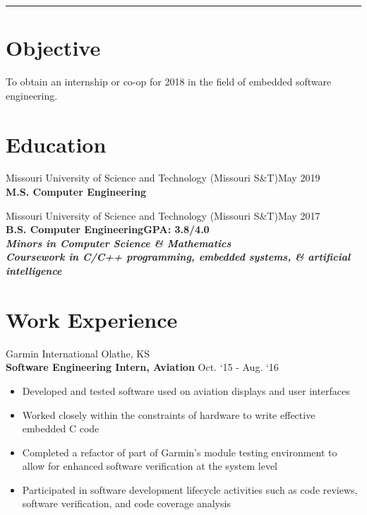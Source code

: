 \documentclass[resmargin]{res}
\begin{document}

\address{503 N. Oak St.\\Rolla, MO 65401}
\address{816-785-4105\\sm67c@mst.edu}

\begin{resume}

\hspace{-1.26in}\noindent\rule{7.0in}{0.4pt}

\section{Objective}
To obtain an internship or co-op for 2018 in the field of embedded software engineering.

\section{Education}
Missouri University of Science and Technology (Missouri S\&T)\hfill May 2019 \\
{\bf M.S. Computer Engineering}%

Missouri University of Science and Technology (Missouri S\&T)\hfill May 2017 \\
{\bf B.S. Computer Engineering}\hfill	{\bf GPA: 3.8/4.0} \\
{\bf \it Minors in Computer Science \& Mathematics}\\
{\bf \it Coursework in C/C++ programming, embedded systems, \& artificial intelligence}

\section{Work Experience}
Garmin International \hfill Olathe, KS\\
{\bf Software Engineering Intern, Aviation} \hfill Oct. ‘15 - Aug. ‘16
\begin{itemize}
	\item Developed and tested software used on aviation displays and user interfaces
	\item Worked closely within the constraints of hardware to write effective embedded C code
	\item Completed a refactor of part of Garmin's module testing environment to allow for enhanced software verification at the system level
	\item Participated in software development lifecycle activities such as code reviews, software verification, and code coverage analysis


\end{itemize}
\end{resume}
\end{document}
